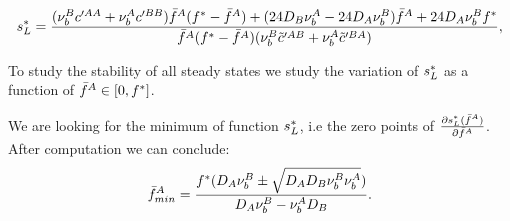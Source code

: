 \begin{equation}
{s^{*}_{L}}=\frac{(\nu_{b}^{B}c'^{AA}+\nu_{b}^{A}c'^{BB}){\bar{f}^A}(f^*-{\bar{f}^A})+(24 D_B\nu_{b}^{A}-24 D_A\nu_{b}^{B}){\bar{f}^A}+24 D_A\nu_{b}^{B}f^*}{{\bar{f}^A}(f^*-{\bar{f}^A})(\nu_{b}^{B}\tilde{c}'^{AB}+\nu_{b}^{A}\tilde{c}'^{BA})},
\end{equation}


To study the stability of all steady states we study the variation of ${s^{*}_{L}}$ as a function of ${\bar{f}^A}\in[0,f^*]$.


We are looking for the minimum of function ${s^{*}_{L}}$, i.e the zero points of $\frac{{\partial} {s^{*}_{L}}({\bar{f}^A})}{{\partial} {\bar{f}^A}}$. After computation we can conclude: 
\begin{equation}
{\bar{f}^A}_{min}=\frac{f^*(D_A \nu_b^B \pm \sqrt{D_A D_B \nu_b^B \nu_b^A})}{D_A \nu_b^B -\nu_b^A D_B}.
\end{equation}


%

